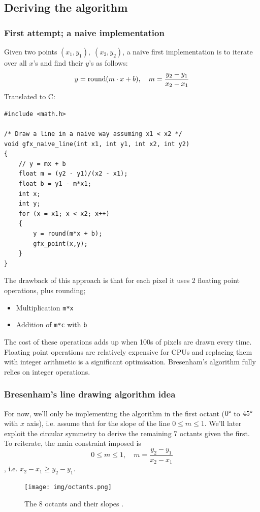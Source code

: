 \documentclass[a4paper]{article}
\begin{document}
\subsection{Deriving the algorithm}
\subsubsection{First attempt; a naive implementation}

Given two points $(x_1,y_1), \; (x_2,y_2)$, a naive first implementation is to iterate over all $x$'s and find their $y$'s as follows:
\begin{equation}
	y = \textup{round}(m\cdot x + b), \quad m = \frac{y_2 - y_1}{x_2 - x_1} 
\end{equation}
Translated to C:
\begin{verbatim}
#include <math.h>

/* Draw a line in a naive way assuming x1 < x2 */
void gfx_naive_line(int x1, int y1, int x2, int y2)
{
    // y = mx + b
    float m = (y2 - y1)/(x2 - x1);
    float b = y1 - m*x1; 
    int x;
    int y;
    for (x = x1; x < x2; x++)
    {
        y = round(m*x + b);
        gfx_point(x,y);
    }
}
\end{verbatim}
The drawback of this approach is that for each pixel it uses 2 floating point operations, plus rounding;
\begin{itemize}
	\item Multiplication \texttt{m*x}
	\item Addition of \texttt{m*c} with \texttt{b}
\end{itemize}
The cost of these operations adds up when 100s of pixels are drawn every time. Floating point operations are relatively expensive for CPUs and replacing them with integer arithmetic is a significant optimisation. Bresenham's algorithm fully relies on integer operations.


\subsubsection{Bresenham's line drawing algorithm idea}
For now, we'll only be implementing the algorithm in the first octant ($0\degree$ to $45\degree$ with $x$ axis), i.e. assume that for the slope of the line $0 \leq m \leq 1$. We'll later exploit the circular symmetry to derive the remaining 7 octants given the first. To reiterate, the main constraint imposed is
\begin{equation}
	0 \leq m \leq 1,\quad m = \frac{y_2-y_1}{x_2-x_1} 
	\label{eq:slope_leq_1}
\end{equation}
, i.e. $x_2 - x_1 \geq y_2 - y_1$.
\begin{figure}[H]
	\centering
	\texttt{[image: img/octants.png]}
	\caption{The 8 octants and their slopes \cite{mallinus}.}
	\label{fig:octants}
\end{figure}
\end{document}
